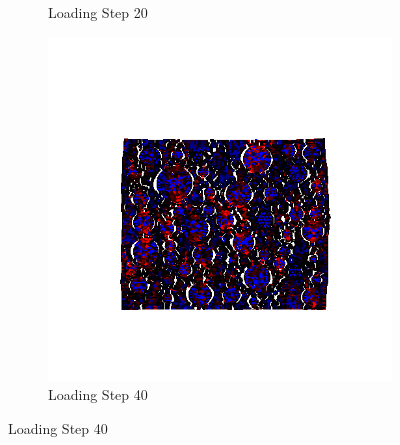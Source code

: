 \begin{figure}[ht]
\begin{subfigure}{.33\textwidth}
      \caption{Loading Step 20}
      \end{subfigure}%
      \begin{subfigure}{.33\textwidth}
        \centering
        \includegraphics[width=1.0\linewidth]{Files/A30P75_3_IS_Free/DEP50-STEP(060).png}
        \caption{Loading Step 40}
      \end{subfigure}


\end{figure}
